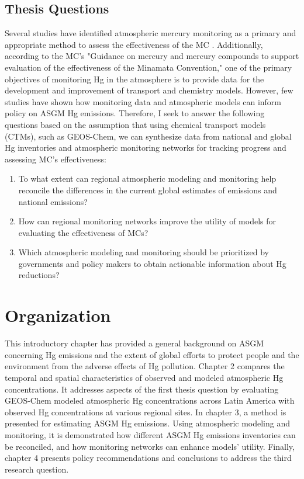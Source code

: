 \begin{flushleft}

 \section{Thesis Questions}
 Several studies have identified atmospheric mercury monitoring as a primary and appropriate method to assess the effectiveness of the MC \cite{sprovieri_atmospheric_2016,evers_evaluating_2016,gustin_measuring_2015,united_nations_environment_programme_technical_2019}. Additionally, according to the MC's "Guidance on mercury and mercury compounds to support evaluation of the effectiveness of the Minamata Convention," one of the primary objectives of monitoring Hg in the atmosphere is to provide data for the development and improvement of transport and chemistry models\cite{unep_guidance_2021}. However, few studies have shown how monitoring data and atmospheric models can inform policy on ASGM Hg emissions. Therefore, I seek to answer the following questions based on the assumption that using chemical transport models (CTMs), such as GEOS-Chem, we can synthesize data from national and global Hg inventories and atmospheric monitoring networks for tracking progress and assessing MC's effectiveness:
\begin{enumerate}
  \item To what extent can regional atmospheric modeling and monitoring help reconcile the differences in the current global estimates of emissions and national emissions?
  \item How can regional monitoring networks improve the utility of models for evaluating the effectiveness of MCs?
  \item Which atmospheric modeling and monitoring should be prioritized by governments and policy makers to obtain actionable information about Hg reductions?
\end{enumerate}
\end{flushleft}

 
\section{Organization}
 
\begin{flushleft}
  This introductory chapter has provided a general background on ASGM concerning Hg emissions and the extent of global efforts to protect people and the environment from the adverse effects of Hg pollution. Chapter 2 compares the temporal and spatial characteristics of observed and modeled atmospheric Hg concentrations. It addresses aspects  of the first thesis question by evaluating GEOS-Chem modeled atmospheric Hg concentrations across Latin America with observed Hg concentrations at various regional sites. In chapter 3, a method is presented for estimating ASGM Hg emissions. Using atmospheric modeling and monitoring, it is demonstrated how different ASGM Hg emissions inventories can be reconciled, and how monitoring networks can enhance models' utility. Finally, chapter 4 presents policy recommendations and conclusions to address the third research question.
\end{flushleft}



